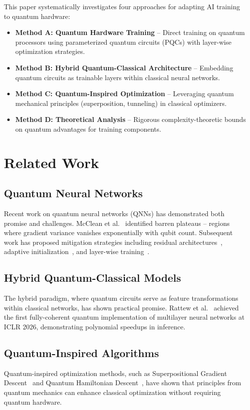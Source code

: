 \documentclass[11pt,a4paper]{article}
\begin{document}
This paper systematically investigates four approaches for adapting AI training to quantum hardware:

\begin{itemize}
    \item \textbf{Method A: Quantum Hardware Training} -- Direct training on quantum processors using parameterized quantum circuits (PQCs) with layer-wise optimization strategies.
    \item \textbf{Method B: Hybrid Quantum-Classical Architecture} -- Embedding quantum circuits as trainable layers within classical neural networks.
    \item \textbf{Method C: Quantum-Inspired Optimization} -- Leveraging quantum mechanical principles (superposition, tunneling) in classical optimizers.
    \item \textbf{Method D: Theoretical Analysis} -- Rigorous complexity-theoretic bounds on quantum advantages for training components.
\end{itemize}

\section{Related Work}

\subsection{Quantum Neural Networks}
Recent work on quantum neural networks (QNNs) has demonstrated both promise and challenges. McClean et al.~\cite{mcclean2018} identified barren plateaus -- regions where gradient variance vanishes exponentially with qubit count. Subsequent work has proposed mitigation strategies including residual architectures~\cite{resqnets2024}, adaptive initialization~\cite{zhuang2026}, and layer-wise training~\cite{mathur2026}.

\subsection{Hybrid Quantum-Classical Models}
The hybrid paradigm, where quantum circuits serve as feature transformations within classical networks, has shown practical promise. Rattew et al.~\cite{rattew2026} achieved the first fully-coherent quantum implementation of multilayer neural networks at ICLR 2026, demonstrating polynomial speedups in inference.

\subsection{Quantum-Inspired Algorithms}
Quantum-inspired optimization methods, such as Superpositional Gradient Descent~\cite{sgd2025} and Quantum Hamiltonian Descent~\cite{leng2025}, have shown that principles from quantum mechanics can enhance classical optimization without requiring quantum hardware.
\end{document}
